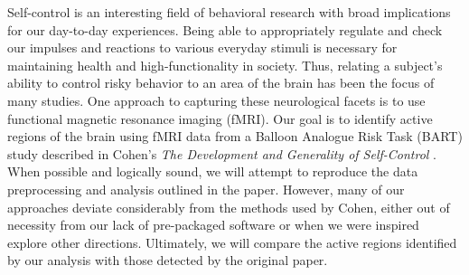 \par Self-control is an interesting field of behavioral research with broad 
implications for our day-to-day experiences. Being able to appropriately 
regulate and check our impulses and reactions to various everyday stimuli 
is necessary for maintaining health and high-functionality in society. 
Thus, relating a subject’s ability to control risky behavior to an area 
of the brain has been the focus of many studies. One approach to 
capturing these neurological facets is to use functional magnetic resonance 
imaging (fMRI). Our goal is to identify active regions of the brain using 
fMRI data from a Balloon Analogue Risk Task (BART) study described in 
Cohen's \textit{The Development and Generality of Self-Control} 
\cite{CohenSelfControl}. When possible and logically sound, we will attempt 
to reproduce the data preprocessing and analysis outlined in the paper. 
However, many of our approaches deviate considerably from the methods 
used by Cohen, either out of necessity from our lack of pre-packaged 
software or when we were inspired explore other directions. Ultimately, we will 
compare the active regions identified by our analysis with those detected 
by the original paper. 
